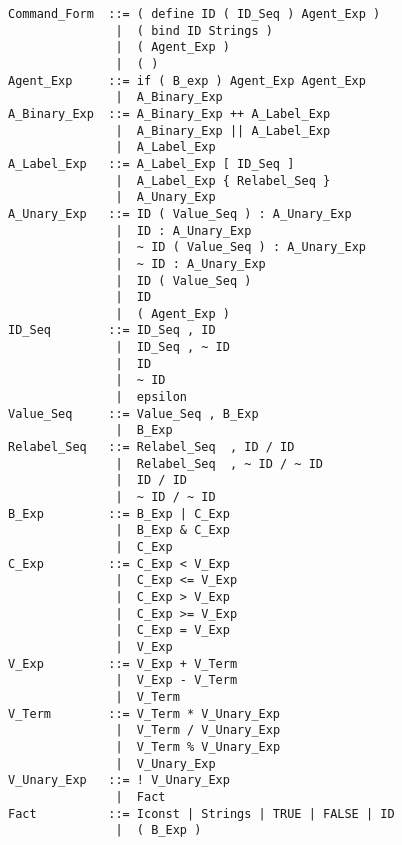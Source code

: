 \footnotesize
  \begin{verbatim}
Command_Form  ::= ( define ID ( ID_Seq ) Agent_Exp )
               |  ( bind ID Strings )
               |  ( Agent_Exp )
               |  ( )
Agent_Exp     ::= if ( B_exp ) Agent_Exp Agent_Exp
               |  A_Binary_Exp
A_Binary_Exp  ::= A_Binary_Exp ++ A_Label_Exp
               |  A_Binary_Exp || A_Label_Exp
               |  A_Label_Exp
A_Label_Exp   ::= A_Label_Exp [ ID_Seq ]
               |  A_Label_Exp { Relabel_Seq }
               |  A_Unary_Exp
A_Unary_Exp   ::= ID ( Value_Seq ) : A_Unary_Exp
               |  ID : A_Unary_Exp
               |  ~ ID ( Value_Seq ) : A_Unary_Exp
               |  ~ ID : A_Unary_Exp
               |  ID ( Value_Seq )
               |  ID
               |  ( Agent_Exp )
ID_Seq        ::= ID_Seq , ID
               |  ID_Seq , ~ ID
               |  ID
               |  ~ ID
               |  epsilon
Value_Seq     ::= Value_Seq , B_Exp
               |  B_Exp
Relabel_Seq   ::= Relabel_Seq  , ID / ID
               |  Relabel_Seq  , ~ ID / ~ ID
               |  ID / ID
               |  ~ ID / ~ ID
B_Exp         ::= B_Exp | C_Exp
               |  B_Exp & C_Exp
               |  C_Exp
C_Exp         ::= C_Exp < V_Exp
               |  C_Exp <= V_Exp
               |  C_Exp > V_Exp
               |  C_Exp >= V_Exp
               |  C_Exp = V_Exp
               |  V_Exp
V_Exp         ::= V_Exp + V_Term
               |  V_Exp - V_Term
               |  V_Term
V_Term        ::= V_Term * V_Unary_Exp
               |  V_Term / V_Unary_Exp
               |  V_Term % V_Unary_Exp
               |  V_Unary_Exp
V_Unary_Exp   ::= ! V_Unary_Exp
               |  Fact
Fact          ::= Iconst | Strings | TRUE | FALSE | ID
               |  ( B_Exp )
  \end{verbatim}
